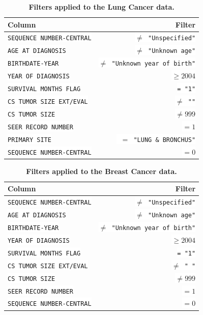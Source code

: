 \documentclass[10pt,letterpaper]{article}
\newcommand{\codewhite}[1]{\colorbox{white}{\texttt{#1}}}
\begin{document}
\begin{table}[!ht]
\begin{adjustwidth}{-2.25in}{0in} %
\caption{\label{tab:lungfilter} {\bf Filters applied to the Lung Cancer data.}}
\begin{tabular}{lr}
\toprule
 Column &  Filter \\
\midrule
\codewhite{SEQUENCE NUMBER-CENTRAL} & \codewhite{$\neq$ "Unspecified"} \\
\codewhite{AGE AT DIAGNOSIS} & \codewhite{$\neq$ "Unknown age"} \\
\codewhite{BIRTHDATE-YEAR} & \codewhite{$\neq$ "Unknown year of birth"} \\
\codewhite{YEAR OF DIAGNOSIS} & \codewhite{$\geq 2004$} \\
\codewhite{SURVIVAL MONTHS FLAG} & \codewhite{= "1"}\\
\codewhite{CS TUMOR SIZE EXT/EVAL} & \codewhite{$\neq$ ""} \\
\codewhite{CS TUMOR SIZE} & \codewhite{$\neq 999$} \\
\codewhite{SEER RECORD NUMBER} & \codewhite{$= 1$} \\
\codewhite{PRIMARY SITE} & \codewhite{ $=$ "LUNG \& BRONCHUS"} \\
\codewhite{SEQUENCE NUMBER-CENTRAL} & \codewhite{$=0$} \\
\bottomrule
\end{tabular}
\end{adjustwidth}
\end{table}



\begin{table}[!ht]
\begin{adjustwidth}{-2.25in}{0in} %
\caption{\label{tab:breastfilter} {\bf Filters applied to the Breast Cancer data.}}
\begin{tabular}{lr}
\toprule
 Column &  Filter \\
\midrule
\codewhite{SEQUENCE NUMBER-CENTRAL} & \codewhite{$\neq$ "Unspecified"} \\
\codewhite{AGE AT DIAGNOSIS} & \codewhite{$\neq$ "Unknown age"} \\
\codewhite{BIRTHDATE-YEAR} & \codewhite{$\neq$ "Unknown year of birth"} \\
\codewhite{YEAR OF DIAGNOSIS} & \codewhite{$\geq 2004$} \\
\codewhite{SURVIVAL MONTHS FLAG} & \codewhite{= "1"}\\
\codewhite{CS TUMOR SIZE EXT/EVAL} & \codewhite{$\neq$ " "} \\
\codewhite{CS TUMOR SIZE} & \codewhite{$\neq 999$} \\
\codewhite{SEER RECORD NUMBER} & \codewhite{$= 1$} \\
\codewhite{SEQUENCE NUMBER-CENTRAL} & \codewhite{$=0$} \\
\bottomrule
\end{tabular}
\end{adjustwidth}
\end{table}
\end{document}
